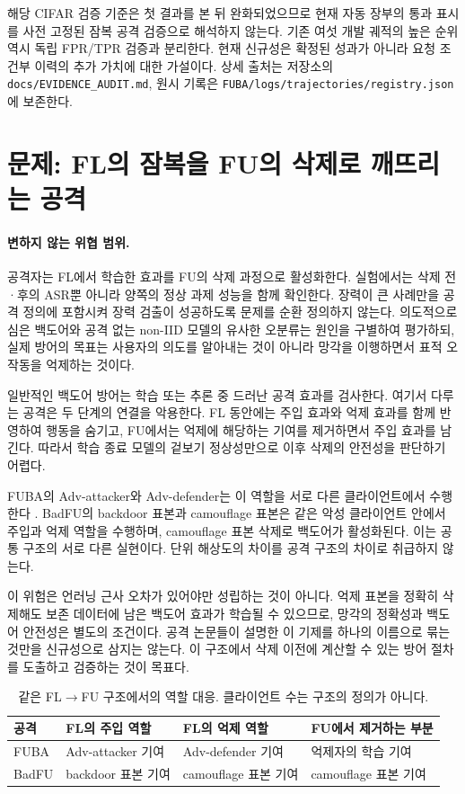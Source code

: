 \documentclass[10pt,a4paper]{article}
\begin{document}
해당 CIFAR 검증 기준은 첫 결과를 본 뒤 완화되었으므로 현재 자동 장부의
통과 표시를 사전 고정된 잠복 공격 검증으로 해석하지 않는다.
기존 여섯 개발 궤적의 높은 순위 역시 독립 FPR/TPR 검증과 분리한다.
현재 신규성은 확정된 성과가 아니라 요청 조건부 이력의 추가 가치에 대한 가설이다.
상세 출처는 저장소의 \texttt{docs/EVIDENCE\_AUDIT.md},
원시 기록은 \texttt{FUBA/logs/trajectories/registry.json}에 보존한다.

\section{문제: FL의 잠복을 FU의 삭제로 깨뜨리는 공격}
\paragraph{변하지 않는 위협 범위.}
공격자는 FL에서 학습한 효과를 FU의 삭제 과정으로 활성화한다.
실험에서는 삭제 전·후의 ASR뿐 아니라 양쪽의 정상 과제 성능을 함께 확인한다.
장력이 큰 사례만을 공격 정의에 포함시켜 장력 검출이 성공하도록 문제를 순환 정의하지 않는다.
의도적으로 심은 백도어와 공격 없는 non-IID 모델의 유사한 오분류는 원인을 구별하여 평가하되,
실제 방어의 목표는 사용자의 의도를 알아내는 것이 아니라 망각을 이행하면서 표적 오작동을 억제하는 것이다.

일반적인 백도어 방어는 학습 또는 추론 중 드러난 공격 효과를 검사한다.
여기서 다루는 공격은 두 단계의 연결을 악용한다.
FL 동안에는 주입 효과와 억제 효과를 함께 반영하여 행동을 숨기고,
FU에서는 억제에 해당하는 기여를 제거하면서 주입 효과를 남긴다.
따라서 학습 종료 모델의 겉보기 정상성만으로 이후 삭제의 안전성을 판단하기 어렵다.

FUBA의 Adv-attacker와 Adv-defender는 이 역할을 서로 다른 클라이언트에서 수행한다
\cite{fuba}. BadFU의 backdoor 표본과 camouflage 표본은 같은 악성 클라이언트 안에서
주입과 억제 역할을 수행하며, camouflage 표본 삭제로 백도어가 활성화된다\cite{badfu}.
이는 공통 구조의 서로 다른 실현이다. 단위 해상도의 차이를 공격 구조의 차이로 취급하지 않는다.

이 위험은 언러닝 근사 오차가 있어야만 성립하는 것이 아니다.
억제 표본을 정확히 삭제해도 보존 데이터에 남은 백도어 효과가 학습될 수 있으므로,
망각의 정확성과 백도어 안전성은 별도의 조건이다.
공격 논문들이 설명한 이 기제를 하나의 이름으로 묶는 것만을 신규성으로 삼지는 않는다.
이 구조에서 삭제 이전에 계산할 수 있는 방어 절차를 도출하고 검증하는 것이 목표다.

\begin{table}[ht]\centering\small
\caption{같은 FL$\to$FU 구조에서의 역할 대응. 클라이언트 수는 구조의 정의가 아니다.}
\begin{tabularx}{\linewidth}{lXXX}\toprule
공격 & FL의 주입 역할 & FL의 억제 역할 & FU에서 제거하는 부분\\\midrule
FUBA & Adv-attacker 기여 & Adv-defender 기여 & 억제자의 학습 기여\\
BadFU & backdoor 표본 기여 & camouflage 표본 기여 & camouflage 표본 기여\\\bottomrule
\end{tabularx}
\end{table}
\end{document}
